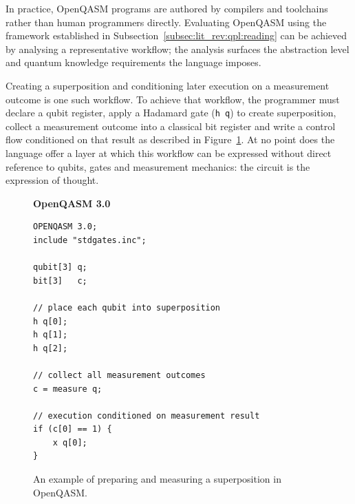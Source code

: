 In practice, OpenQASM programs are authored by compilers and toolchains rather than human programmers directly.
Evaluating OpenQASM using the framework established in Subsection~\ref{subsec:lit_rev:qpl:reading} can be achieved by analysing a representative workflow; the analysis surfaces the abstraction level and quantum knowledge requirements the language imposes.

Creating a superposition and conditioning later execution on a measurement outcome is one such workflow.
To achieve that workflow, the programmer must declare a qubit register, apply a Hadamard gate (\texttt{h q}) to create superposition, collect a measurement outcome into a classical bit register and write a control flow conditioned on that result as described in Figure~\ref{fig:lit_rev:qpl:open_qasm_example}.
At no point does the language offer a layer at which this workflow can be expressed without direct reference to qubits, gates and measurement mechanics: the circuit is the expression of thought.

\begin{figure}[htbp]
    \centering
    \begin{minipage}[t]{0.65\textwidth}
        \centering
        \textbf{OpenQASM 3.0}
        \begin{lstlisting}[basicstyle=\ttfamily\scriptsize,
            frame=single,
            label={lst:lit_rev:qpl:open_qasm_example}]
OPENQASM 3.0;
include "stdgates.inc";

qubit[3] q;
bit[3]   c;

// place each qubit into superposition
h q[0];
h q[1];
h q[2];

// collect all measurement outcomes
c = measure q;

// execution conditioned on measurement result
if (c[0] == 1) {
    x q[0];
}
        \end{lstlisting}
    \end{minipage}
    \caption{An example of preparing and measuring a superposition in OpenQASM.}
    \label{fig:lit_rev:qpl:open_qasm_example}
\end{figure}


